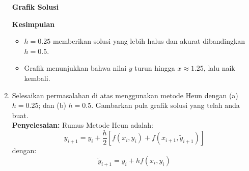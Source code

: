 \documentclass{article}
\newcommand{\penyelesaian}{\textbf{Penyelesaian: }}
\begin{document}
\begin{enumerate}
    \textbf{Grafik Solusi}
    \begin{center}
    \end{center}

    \textbf{Kesimpulan}
    \begin{itemize}
        \item \( h = 0.25 \) memberikan solusi yang lebih halus dan akurat dibandingkan \( h = 0.5 \).
        \item Grafik menunjukkan bahwa nilai \( y \) turun hingga \( x \approx 1.25 \), lalu naik kembali.
    \end{itemize}

    \item Selesaikan permasalahan di atas menggunakan metode Heun dengan (a) $h = \num{0,25}$; dan (b) $h = \num{0,5}$. Gambarkan pula grafik solusi yang telah anda buat. \\
    \penyelesaian 
    Rumus Metode Heun adalah:
    \[
    y_{i+1} = y_i + \frac{h}{2} \left[f(x_i, y_i) + f(x_{i+1}, \tilde{y}_{i+1})\right]
    \]
    dengan:
    \[
    \tilde{y}_{i+1} = y_i + h f(x_i, y_i)
    \]

    \begin{itemize}


\end{itemize}
\end{enumerate}
\end{document}
